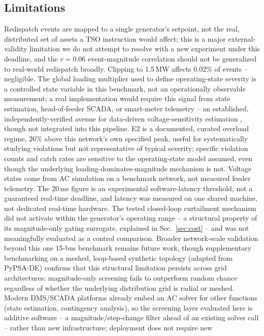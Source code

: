 \documentclass[11pt,conference]{IEEEtran}
\begin{document}
\subsection{Limitations}
\label{sec:limitations}
Redispatch events are mapped to a single generator's setpoint, not the real, distributed set of
assets a TSO instruction would affect; this is a major external-validity limitation we do not
attempt to resolve with a new experiment under this deadline, and the $r=0.06$ event-magnitude
correlation should not be generalized to real-world redispatch broadly. Clipping to 1.5\,MW affects
0.02\% of events -- negligible. The global loading multiplier used to define operating-state
severity is a controlled state variable in this benchmark, not an operationally observable
measurement; a real implementation would require this signal from state estimation, head-of-feeder
SCADA, or smart-meter telemetry -- an established, independently-verified avenue for
data-driven voltage-sensitivity estimation \cite{ref:valverde2018}, though not integrated
into this pipeline. E2 is a documented,
curated overload regime, $26\%$ above this network's own specified peak, useful for systematically
studying violations but not representative of typical severity; specific violation counts and catch
rates are sensitive to the operating-state model assumed, even though the underlying
loading-dominates-magnitude mechanism is not. Voltage states come from AC simulation on a benchmark
network, not measured feeder telemetry. The 20\,ms figure is an experimental software-latency
threshold, not a guaranteed real-time deadline, and latency was measured on one shared machine, not
dedicated real-time hardware. The tested closed-loop curtailment mechanism did not activate within
the generator's operating range -- a structural property of its magnitude-only gating surrogate,
explained in Sec.~\ref{sec:cost} -- and was not meaningfully evaluated as a control comparison. Broader
network-scale validation beyond this one 15-bus benchmark remains future work, though supplementary 
benchmarking on a meshed, loop-based synthetic topology (adapted from PyPSA-DE) confirms that 
this structural limitation persists across grid architectures: magnitude-only screening fails to outperform random 
chance regardless of whether the underlying distribution grid is radial or meshed. Modern DMS/SCADA
platforms already embed an AC solver for other functions (state estimation, contingency analysis),
so the screening layer evaluated here is additive software -- a magnitude/step-change filter
ahead of an existing solver call -- rather than new infrastructure; deployment does not require new
\end{document}
